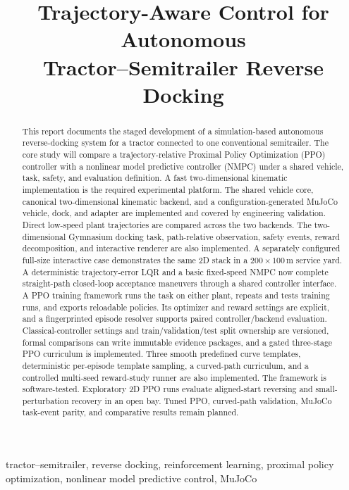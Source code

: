 \documentclass[conference]{IEEEtran}
\title{Trajectory-Aware Control for Autonomous\\
Tractor--Semitrailer Reverse Docking}
\author{
  \IEEEauthorblockN{Nandan Prince}
  \IEEEauthorblockA{MSML 642}
  \and
  \IEEEauthorblockN{Chris Pedretti}
  \IEEEauthorblockA{MSML 642}
}
\begin{document}
\maketitle

\begin{abstract}
This report documents the staged development of a simulation-based autonomous
reverse-docking system for a tractor connected to one conventional
semitrailer. The core study will compare a trajectory-relative Proximal Policy
Optimization (PPO) controller with a nonlinear model predictive controller
(NMPC) under a shared vehicle, task, safety, and evaluation definition. A fast
two-dimensional kinematic implementation is the required experimental
platform. The shared vehicle core, canonical two-dimensional kinematic backend,
and a configuration-generated MuJoCo vehicle, dock, and adapter are implemented
and covered by engineering validation. Direct low-speed plant trajectories are
compared across the two backends. The two-dimensional Gymnasium docking task,
path-relative observation, safety events, reward decomposition, and interactive
renderer are also implemented. A separately configured full-size interactive
case demonstrates the same 2D stack in a $200\times100\,\mathrm{m}$ service
yard. A deterministic trajectory-error LQR and a basic fixed-speed NMPC now
complete straight-path closed-loop acceptance maneuvers through a shared
controller interface. A PPO training framework runs the task on either plant,
repeats and tests training runs, and exports reloadable policies. Its optimizer
and reward settings are explicit, and a fingerprinted episode resolver supports
paired controller/backend evaluation. Classical-controller settings and
train/validation/test split ownership are versioned, formal comparisons can
write immutable evidence packages, and a gated three-stage PPO curriculum is
implemented. Three smooth predefined curve templates, deterministic
per-episode template sampling, a curved-path curriculum, and a controlled
multi-seed reward-study runner are also implemented. The framework is
software-tested. Exploratory 2D PPO runs evaluate aligned-start reversing and
small-perturbation recovery in an open bay. Tuned PPO, curved-path validation,
MuJoCo task-event parity, and comparative results remain planned.
\end{abstract}

\begin{IEEEkeywords}
tractor--semitrailer, reverse docking, reinforcement learning, proximal policy
optimization, nonlinear model predictive control, MuJoCo
\end{IEEEkeywords}














\end{document}

